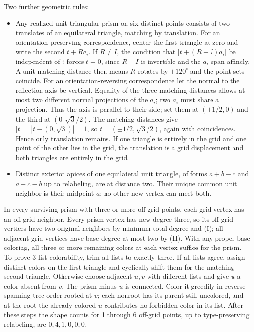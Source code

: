 \documentclass[11pt,letterpaper]{article}
\begin{document}
Two further geometric rules:
\begin{itemize}
\item Any realized unit triangular prism on six
distinct points consists of two translates of an equilateral triangle,
matching by translation. For an orientation-preserving correspondence,
center the first triangle at zero and write the second \(t+Ra_i\). If
\(R\ne I\), the condition that \(|t+(R-I)a_i|\) be independent of \(i\)
forces \(t=0\), since \(R-I\) is invertible and the \(a_i\) span
affinely. A unit matching distance then means \(R\) rotates by
\(\pm120^\circ\) and the point sets coincide. For an
orientation-reversing correspondence let the normal to the reflection
axis be vertical. Equality of the three matching distances allows at
most two different normal projections of the \(a_i\); two \(a_i\) must
share a projection. Thus the axis is parallel to their side; set them at
\((\pm1/2,0)\) and the third at \((0,\sqrt3/2)\). The matching distances
give \(|t|=|t-(0,\sqrt3)|=1\), so \(t=(\pm1/2,\sqrt3/2)\), again with
coincidences. Hence only translation remains. If one triangle is
entirely in the grid and one point of the other lies in the grid, the
translation is a grid displacement and both triangles are entirely in
the grid.
\item Distinct exterior apices of one equilateral unit triangle,
of forms \(a+b-c\) and \(a+c-b\) up to relabeling, are at distance two.
Their unique common unit neighbor is their midpoint \(a\); no other new
vertex can meet both.
\end{itemize}

In every surviving prism with three or more off-grid points, each grid
vertex has an off-grid neighbor. Every prism vertex has new degree
three, so its off-grid vertices have two original neighbors by minimum
total degree and (I); all adjacent grid vertices have base degree at
most two by (II). With any proper base coloring, all three or more
remaining colors at each vertex suffice for the prism. To prove
3-list-colorability, trim all lists to exactly three. If all lists
agree, assign distinct colors on the first triangle and cyclically shift
them for the matching second triangle. Otherwise choose adjacent \(u,v\)
with different lists and give \(u\) a color absent from \(v\). The prism
minus \(u\) is connected. Color it greedily in reverse spanning-tree
order rooted at \(v\); each nonroot has its parent still uncolored, and
at the root the already colored \(u\) contributes no forbidden color in
its list. After these steps the shape counts for 1 through 6 off-grid
points, up to type-preserving relabeling, are \(0,4,1,0,0,0\).
\end{document}
